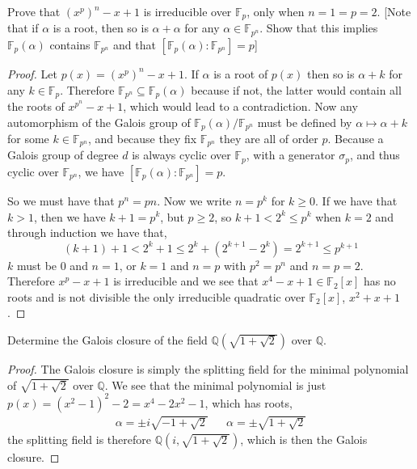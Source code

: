 \documentclass[11pt]{article}
\newenvironment{problem}[2][Problem\!]{\begin{tcolorbox}\begin{trivlist}
\item[\hskip \labelsep {\bfseries #1}\hskip \labelsep {\bfseries #2}]}{\end{trivlist}\end{tcolorbox}}
\newcommand{\qq}{\mathbb Q}   %
\newcommand{\ff}{\mathbb F}   %
\renewcommand{\geq}{\geqslant}
\renewcommand{\leq}{\leqslant}
\begin{document}
\vspace*{15pt}

\begin{problem}{14.3.11}
    Prove that $(x^{p})^{n} - x + 1$ is irreducible over $\ff_p$, only when $n = 1 = p = 2$. [Note that if $\alpha$ is a root, then so is $\alpha + \alpha $ for any $\alpha \in \ff_{p^{n}}$. Show that this implies $\ff_p(\alpha )$ contains $\ff_{p^{n}}$ and that $[\ff_p(\alpha): \ff_{p^{n}}] = p$]
\end{problem}
\begin{proof}
    Let $p(x) = (x^{p})^{n} - x + 1$. If $\alpha$ is a root of $p(x)$ then so is $\alpha + k$ for any $k \in \ff_p$. Therefore $\ff_{p^{n}} \subseteq \ff_p(\alpha)$ because if not, the latter would contain all the roots of $x^{p^{n}} - x + 1$, which would lead to a contradiction. Now any automorphism of the Galois group of $\ff_p(\alpha)/\ff_{p^{n}}$ must be defined by $\alpha \mapsto \alpha + k$ for some $k \in \ff_{p^{n}}$, and because they fix $\ff_{p^{n}}$ they are all of order $p$. Because a Galois group of degree $d$ is always cyclic over $\ff_p$, with a generator $\sigma_p$, and thus cyclic over $\ff_{p^{n}}$, we have $[\ff_p(\alpha): \ff_{p^{n}}] = p.$

    So we must have that $p^{n} = pn$. Now we write $n = p^{k}$ for $k \geq 0$. If we have that $k > 1$, then we have $k + 1 = p^{k}$, but $p\geq 2$, so $k + 1 < 2^{k} \leq p^{k}$ when $k = 2$ and through induction we have that,
    \[(k + 1) +1 < 2^{k} + 1 \leq 2^{k} + (2^{k + 1} - 2^{k}) = 2^{k + 1} \leq p^{k + 1}\]
    $k$ must be 0 and $n = 1$, or $k =1$ and $n = p$ with $p^{2} = p^{n}$ and $n = p = 2$. Therefore $x^{p} - x + 1$ is irreducible and we see that $x^{4}- x + 1 \in \ff_2[x]$ has no roots and is not divisible the only irreducible quadratic over $\ff_2[x]$, $x^{2} + x + 1$.
\end{proof}

\newpage

\begin{problem}{14.4.1}
    Determine the Galois closure of the field $\qq(\sqrt{1 + \sqrt{2}})$ over $\qq$.
\end{problem}
\begin{proof}
    The Galois closure is simply the splitting field for the minimal polynomial of $\sqrt{1 + \sqrt{2}}$ over $\qq$. We see that the minimal polynomial is just $p(x) = (x^{2} - 1)^{2} -2 = x^{4} -2x^{2} -1$, which has roots,
    \begin{align*}
        \alpha = \pm i \sqrt{-1 + \sqrt{2}}&& \alpha = \pm\sqrt{1 + \sqrt{2}}
    \end{align*}
    the splitting field is therefore $\qq(i, \sqrt{1 + \sqrt{2}})$, which is then the Galois closure. 
\end{proof}
\end{document}
